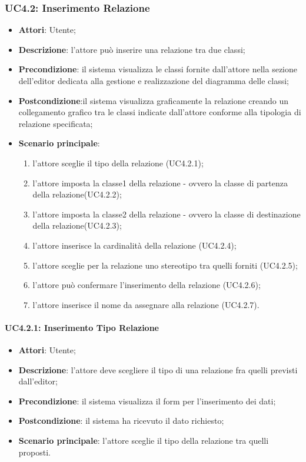 \subsubsection{UC4.2: Inserimento Relazione}
\label{UC4.2}
\begin{itemize}
\item \textbf{Attori}: Utente;
\item \textbf{Descrizione}: l'attore può inserire una relazione tra due classi;
\item \textbf{Precondizione}: il sistema visualizza le classi fornite dall'attore nella sezione dell'editor dedicata alla gestione e realizzazione del diagramma delle classi;
\item \textbf{Postcondizione}:il sistema visualizza graficamente la relazione creando un collegamento grafico tra le classi indicate dall'attore conforme alla tipologia di relazione specificata;
\item \textbf{Scenario principale}:
\begin{enumerate}
	\item l'attore sceglie il tipo della relazione (UC4.2.1); 
	\item l'attore imposta la classe1 della relazione - ovvero la classe di partenza della relazione(UC4.2.2);
	\item l'attore imposta la classe2 della relazione - ovvero la classe di destinazione della relazione(UC4.2.3);
	\item l'attore inserisce la cardinalità della relazione (UC4.2.4);
	\item l'attore sceglie per la relazione uno stereotipo tra quelli forniti (UC4.2.5);
	\item l'attore può confermare l'inserimento della relazione (UC4.2.6);
	\item l'attore inserisce il nome da assegnare alla relazione (UC4.2.7).
\end{enumerate}
\end{itemize}

\paragraph{UC4.2.1: Inserimento Tipo Relazione}
\label{UC4.2.1}
\begin{itemize}
\item \textbf{Attori}: Utente;
\item \textbf{Descrizione}: l'attore deve scegliere il tipo di una relazione fra quelli previsti dall'editor;
\item \textbf{Precondizione}: il sistema visualizza il form per l'inserimento dei dati;
\item \textbf{Postcondizione}: il sistema ha ricevuto il dato richiesto;
\item \textbf{Scenario principale}:
l'attore sceglie il tipo della relazione tra quelli proposti.
\end{itemize}


